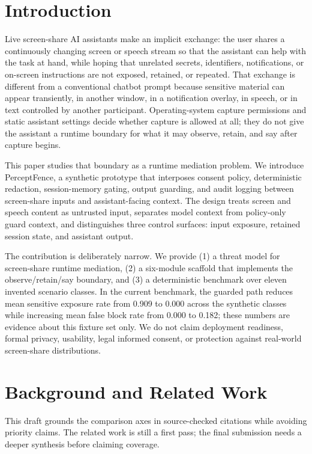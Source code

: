 \documentclass[manuscript,review,anonymous]{acmart}
\begin{document}
\section{Introduction}
Live screen-share AI assistants make an implicit exchange: the user shares a continuously changing screen or speech stream so that the assistant can help with the task at hand, while hoping that unrelated secrets, identifiers, notifications, or on-screen instructions are not exposed, retained, or repeated.
That exchange is different from a conventional chatbot prompt because sensitive material can appear transiently, in another window, in a notification overlay, in speech, or in text controlled by another participant.
Operating-system capture permissions and static assistant settings decide whether capture is allowed at all; they do not give the assistant a runtime boundary for what it may observe, retain, and say after capture begins.

This paper studies that boundary as a runtime mediation problem.
We introduce PerceptFence, a synthetic prototype that interposes consent policy, deterministic redaction, session-memory gating, output guarding, and audit logging between screen-share inputs and assistant-facing context.
The design treats screen and speech content as untrusted input, separates model context from policy-only guard context, and distinguishes three control surfaces: input exposure, retained session state, and assistant output.

The contribution is deliberately narrow.
We provide (1) a threat model for screen-share runtime mediation, (2) a six-module scaffold that implements the observe/retain/say boundary, and (3) a deterministic benchmark over eleven invented scenario classes.
In the current benchmark, the guarded path reduces mean sensitive exposure rate from 0.909 to 0.000 across the synthetic classes while increasing mean false block rate from 0.000 to 0.182; these numbers are evidence about this fixture set only.
We do not claim deployment readiness, formal privacy, usability, legal informed consent, or protection against real-world screen-share distributions.

\section{Background and Related Work}
This draft grounds the comparison axes in source-checked citations while avoiding priority claims.
The related work is still a first pass; the final submission needs a deeper synthesis before claiming coverage.
\end{document}
